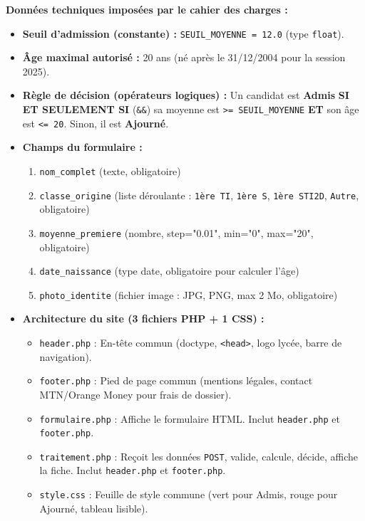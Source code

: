 \documentclass[11pt]{article}
\begin{document}
\textbf{Données techniques imposées par le cahier des charges :}
\begin{itemize}
    \item \textbf{Seuil d'admission (constante) :} \texttt{SEUIL\_MOYENNE = 12.0} (type \texttt{float}).
    \item \textbf{Âge maximal autorisé :} 20 ans (né après le 31/12/2004 pour la session 2025).
    \item \textbf{Règle de décision (opérateurs logiques) :} Un candidat est \textbf{Admis} \textbf{SI ET SEULEMENT SI} (\texttt{\&\&}) sa moyenne est \texttt{>= SEUIL\_MOYENNE} \textbf{ET} son âge est \texttt{<= 20}. Sinon, il est \textbf{Ajourné}.
    \item \textbf{Champs du formulaire :}
    \begin{enumerate}
        \item \texttt{nom\_complet} (texte, obligatoire)
        \item \texttt{classe\_origine} (liste déroulante : \texttt{1ère TI}, \texttt{1ère S}, \texttt{1ère STI2D}, \texttt{Autre}, obligatoire)
        \item \texttt{moyenne\_premiere} (nombre, step="0.01", min="0", max="20", obligatoire)
        \item \texttt{date\_naissance} (type date, obligatoire pour calculer l'âge)
        \item \texttt{photo\_identite} (fichier image : JPG, PNG, max 2 Mo, obligatoire)
    \end{enumerate}
    \item \textbf{Architecture du site (3 fichiers PHP + 1 CSS) :}
    \begin{itemize}
        \item \texttt{header.php} : En-tête commun (doctype, \texttt{<head>}, logo lycée, barre de navigation).
        \item \texttt{footer.php} : Pied de page commun (mentions légales, contact MTN/Orange Money pour frais de dossier).
        \item \texttt{formulaire.php} : Affiche le formulaire HTML. Inclut \texttt{header.php} et \texttt{footer.php}.
        \item \texttt{traitement.php} : Reçoit les données \texttt{POST}, valide, calcule, décide, affiche la fiche. Inclut \texttt{header.php} et \texttt{footer.php}.
        \item \texttt{style.css} : Feuille de style commune (vert pour Admis, rouge pour Ajourné, tableau lisible).
    \end{itemize}
\end{itemize}
\end{document}
